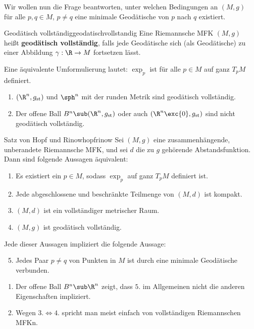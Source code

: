 Wir wollen nun die Frage beantworten, unter welchen Bedingungen an $(M,g)$ für alle $p,q \in M$, $p \neq q$ eine minimale Geodätische von $p$ nach $q$ existiert.
\begin{definition}{Geodätisch vollständig}{geodatischvollstandig}
Eine Riemannsche MFK $(M,g)$ heißt \textbf{geodätisch vollständig}, falls jede Geodätische sich (als Geodätische) zu einer Abbildung $\gamma: \R \to M$ fortsetzen lässt.
\end{definition}
\begin{bemerkung}
Eine äquivalente Umformulierung lautet: $\exp_p$ ist für alle $p \in M$ auf ganz $T_pM$ definiert.
\end{bemerkung}
\begin{beispiele}
\begin{enumerate}
\item $(\R^n, g_\text{st})$ und $\sph^n$ mit der runden Metrik sind geodätisch vollständig.
\item Der offene Ball $B^n \sub (\R^n, g_\text{st})$ oder auch $(\R^n \exc \{ 0 \}, g_\text{st})$ sind nicht geodätisch vollständig.
\end{enumerate}
\end{beispiele}
\begin{theorem}{Satz von Hopf und Rinow}{hopfrinow}
Sei $(M,g)$ eine zusammenhängende, unberandete Riemannsche MFK, und sei $d$ die zu $g$ gehörende Abstandsfunktion. Dann sind folgende Aussagen äquivalent:
\begin{enumerate}
\item Es existiert ein $p \in M$, sodass $\exp_p$ auf ganz $T_pM$ definiert ist.
\item Jede abgeschlossene und beschränkte Teilmenge von $(M,d)$ ist kompakt.
\item $(M,d)$ ist ein vollständiger metrischer Raum.
\item $(M,g)$ ist geodätisch vollständig.
\end{enumerate}
Jede dieser Aussagen impliziert die folgende Aussage:\\
\begin{enumerate}
\setcounter{enumi}{4}
\item Jedes Paar $p \neq q$ von Punkten in $M$ ist durch eine minimale Geodätische verbunden.
\end{enumerate}
\end{theorem}
\begin{bemerkungen}
\begin{enumerate}
\item Der offene Ball $B^n \sub \R^n$ zeigt, dass $5.$ im Allgemeinen nicht die anderen Eigenschaften impliziert.
\item Wegen $3. \iff 4.$ spricht man meist einfach von vollständigen Riemannschen MFKn.
\end{enumerate}
\end{bemerkungen}
